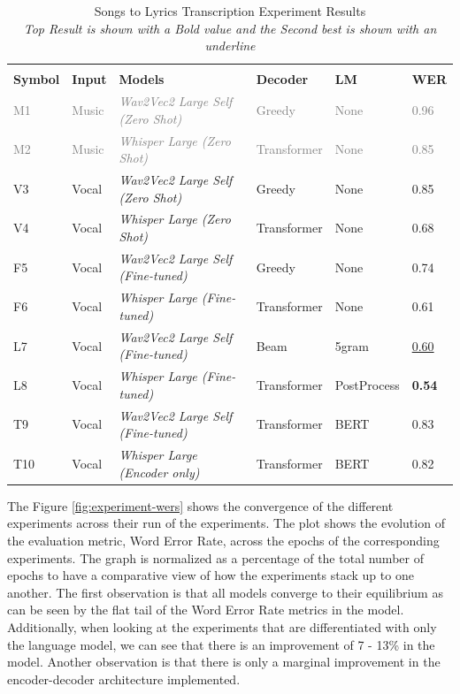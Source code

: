 \renewcommand{\arraystretch}{2}
\setlength{\arrayrulewidth}{0.3mm}
\begin{table}[H]
\small
\begin{center}
\begin{tabular}{ |p{1.5cm} | p{1cm} | p{6cm}| p{2cm}| p{2cm}| p{1cm}| }
\multicolumn{6}{c}{ } \\
\cline{1-6}
\textbf{Symbol} & \textbf{Input} & \textbf{Models}  & \textbf{Decoder} & \textbf{LM} & \textbf{WER}  \\
\hline  \hline
\textcolor{gray}{M1} & \textcolor{gray}{Music} & \textcolor{gray}{\textit{Wav2Vec2 Large Self (Zero Shot)}} & \textcolor{gray}{Greedy} & \textcolor{gray}{None} & \textcolor{gray}{0.96}  \\
\textcolor{gray}{M2} & \textcolor{gray}{Music}  & \textcolor{gray}{\textit{Whisper Large (Zero Shot)}} & \textcolor{gray}{Transformer} &  \textcolor{gray}{None} & \textcolor{gray}{0.85} \\
\hline
V3 & Vocal & \textit{Wav2Vec2 Large Self (Zero Shot)} & Greedy &  None & 0.85  \\
V4 & Vocal  & \textit{Whisper Large (Zero Shot)} & Transformer &  None & 0.68 \\
\hline
F5 & Vocal & \textit{Wav2Vec2 Large Self (Fine-tuned)} & Greedy &  None & 0.74  \\
F6 & Vocal  & \textit{Whisper Large (Fine-tuned)} & Transformer &  None & 0.61 \\
\hline
L7 & Vocal & \textit{Wav2Vec2 Large Self (Fine-tuned)} & Beam &  5gram & \underline{0.60}  \\
L8 & Vocal  & \textit{Whisper Large (Fine-tuned)} & Transformer &  PostProcess & \textbf{0.54} \\
\hline
T9 & Vocal & \textit{Wav2Vec2 Large Self (Fine-tuned)} & Transformer &  BERT & 0.83  \\
T10 & Vocal & \textit{Whisper Large (Encoder only)} & Transformer &  BERT & 0.82  \\

 \hline  \hline
\end{tabular}
\caption{\label{consolidated-results-summary} Songs to Lyrics Transcription Experiment Results \\ \textit{Top Result is shown with a Bold value and the Second best is shown with an underline}}
\end{center}
\end{table}

The Figure \ref{fig:experiment-wers} shows the convergence of the different experiments across their run of the experiments. The plot shows the evolution of the evaluation metric, Word Error Rate, across the epochs of the corresponding experiments. The graph is normalized as a percentage of the total number of epochs to have a comparative view of how the experiments stack up to one another. The first observation is that all models converge to their equilibrium as can be seen by the flat tail of the Word Error Rate metrics in the model. Additionally, when looking at the experiments that are differentiated with only the language model, we can see that there is an improvement of 7 - 13\% in the model. Another observation is that there is only a marginal improvement in the encoder-decoder architecture implemented.

